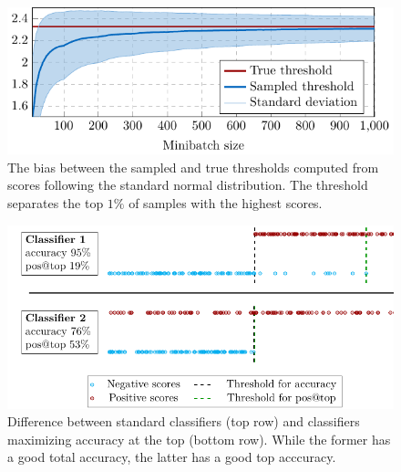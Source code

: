 \begin{figure}[!ht]
  \centering
  \includegraphics[width = \linewidth]{images/deep_threshold_bias.pdf}
  \caption{The bias between the sampled and true thresholds computed from scores following the standard normal distribution. The threshold separates the top $1\%$ of samples with the highest scores.}
  \label{fig:thresholds1}
\end{figure}

\begin{figure}[!ht]
  \centering
  \includegraphics[width = \linewidth]{images/standard_aatp_comparison.pdf}
  \caption{Difference between standard classifiers (top row) and classifiers maximizing accuracy at the top (bottom row). While the former has a good total accuracy, the latter has a good top acccuracy.}
  \label{fig:difference}
\end{figure}

